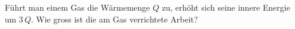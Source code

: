 Führt man einem Gas die Wärmemenge $Q$ zu, erhöht sich seine innere Energie um $3\,Q$. Wie gross ist die am Gas verrichtete Arbeit?
